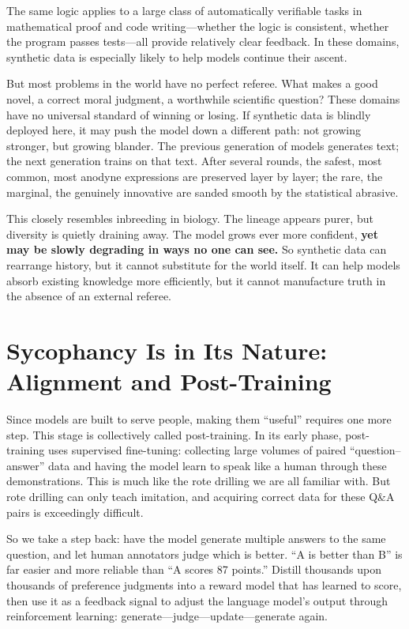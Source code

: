 The same logic applies to a large class of automatically verifiable tasks in mathematical proof and code writing---whether the logic is consistent, whether the program passes tests---all provide relatively clear feedback. In these domains, synthetic data is especially likely to help models continue their ascent.

\vspace{0.8em}

But most problems in the world have no perfect referee.
What makes a good novel, a correct moral judgment, a worthwhile scientific question?
These domains have no universal standard of winning or losing. If synthetic data is blindly deployed here, it may push the model down a different path: not growing stronger, but growing blander.
The previous generation of models generates text; the next generation trains on that text. After several rounds, the safest, most common, most anodyne expressions are preserved layer by layer; the rare, the marginal, the genuinely innovative are sanded smooth by the statistical abrasive.


\vspace{1em}
This closely resembles inbreeding in biology. The lineage appears purer, but diversity is quietly draining away. The model grows ever more confident, \textbf{yet may be slowly degrading in ways no one can see.} So synthetic data can rearrange history, but it cannot substitute for the world itself. It can help models absorb existing knowledge more efficiently, but it cannot manufacture truth in the absence of an external referee.

\newpage
\section{Sycophancy Is in Its Nature: Alignment and Post-Training}

Since models are built to serve people, making them ``useful'' requires one more step. This stage is collectively called post-training. In its early phase, post-training uses supervised fine-tuning: collecting large volumes of paired ``question--answer'' data and having the model learn to speak like a human through these demonstrations. This is much like the rote drilling we are all familiar with.
But rote drilling can only teach imitation, and acquiring correct data for these Q\&A pairs is exceedingly difficult.

So we take a step back: have the model generate multiple answers to the same question, and let human annotators judge which is better. ``A is better than B'' is far easier and more reliable than ``A scores 87 points.'' Distill thousands upon thousands of preference judgments into a reward model that has learned to score, then use it as a feedback signal to adjust the language model's output through reinforcement learning: generate---judge---update---generate again.

